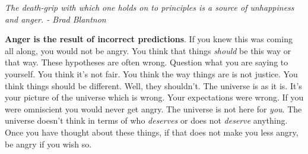 \documentclass[a4paper,hidelinks]{article}
\begin{document}
\newpage

\begin{center}
\textit{The death-grip with which one holds on to principles is a source of unhappiness and anger. - Brad Blantnon}
\end{center}

\textbf{Anger is the result of incorrect predictions}.
If you knew this was coming all along, you would not be angry.
You think that things \textit{should} be this way or that way.
These hypotheses are often wrong.
Question what you are saying to yourself.
You think it's not fair.
You think the way things are is not justice.
You think things should be different.
Well, they shouldn't.
The universe is as it is.
It's your picture of the universe which is wrong.
Your expectations were wrong.
If you were omniscient you would never get angry.
The universe is not here for \textit{you}.
The universe doesn't think in terms of who \textit{deserves} or does not \textit{deserve} anything.
Once you have thought about these things, if that does not make you less angry, be angry if you wish so.

\newpage
\end{document}
